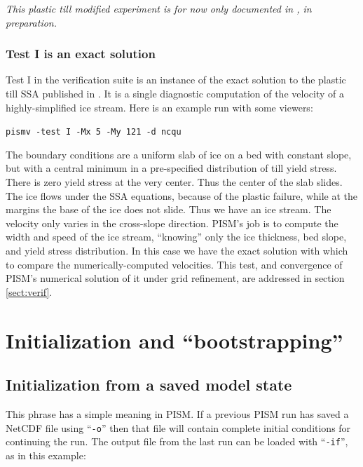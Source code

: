 \documentclass[11pt,final]{amsart}
\newcommand{\pismoptionindex}[1]{\index{options for PISM (and PETSc)!\texttt{-#1}}}
\newcommand{\intextoption}[1]{\texttt{-#1}\pismoptionindex{#1}}
\begin{document}
\emph{This plastic till modified experiment is for now only documented in \cite{BuelerBrownSuper}, in preparation.}


\subsubsection*{Test I is an exact solution}  Test I in the verification suite is an instance of the exact solution to the plastic till SSA published in \cite{SchoofStream}.  It is a single diagnostic computation of the velocity of a highly-simplified ice stream.  Here is an example run with some viewers:

\verb|pismv -test I -Mx 5 -My 121 -d ncqu|

\noindent The boundary conditions are a uniform slab of ice on a bed with constant slope, but with a central minimum in a pre-specified distribution of till yield stress.  There is zero yield stress at the very center.  Thus the center of the slab slides.  The ice flows under the SSA equations, because of the plastic failure, while at the margins the base of the ice does not slide.  Thus we have an ice stream.  The velocity only varies in the cross-slope direction.  PISM's job is to compute the width and speed of the ice stream, ``knowing'' only the ice thickness, bed slope, and yield stress distribution.  In this case we have the exact solution with which to compare the numerically-computed velocities.  This test, and convergence of PISM's numerical solution of it under grid refinement, are addressed in section \ref{sect:verif}.





\clearpage
\newpage
\section{Initialization and ``bootstrapping''}\label{sect:boot}  

\subsection{Initialization from a saved model state}  This phrase has a simple meaning in PISM.  If a previous PISM run has saved a NetCDF file using ``\verb|-o|'' then that file will contain complete initial conditions for continuing the run.  The output file from the last run can be loaded with ``\intextoption{if}'', as in this example:
\end{document}
